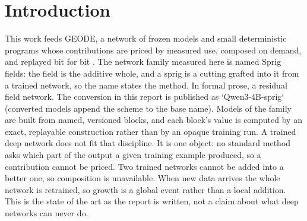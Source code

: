 \documentclass[11pt]{article}
\begin{document}
\begin{abstract}
No prior work converts a pretrained network into nonlinear
closed-form stages that keep exact attribution, deterministic
replay, growth by addition, and composition under a measured gate.
The nearest line replaces pruned transformer blocks with
least-squares linear maps for compression and claims none of
those properties; the transcoder line gives additive attribution
but trains its replacement and does not serve it. Every borrowed
part is cited, and where a neighbouring method does something
better, its adoption is planned and named. The feed-forward
conversion is measured across all thirty-six stages, and the
delivered conversion carries the attention of all thirty-six
layers as well, with its quality limits stated. The benefits also port back to unconverted,
conventionally trained networks: the same closed-form reads give
a trained network's patches measured per-layer contracts without
any conversion, an audit shadow that matches across devices
exactly; its readout can be refitted in closed form on its own
output stream at no loss; and least-squares targets inserted
into training itself deliver measured per-layer contracts at
parity-or-better held-out quality. The negative results that
decided the architecture are published with the positives.
\end{abstract}

\tableofcontents

\section{Introduction}

This work feeds GEODE, a network of frozen models and small
deterministic programs whose contributions are priced by measured
use, composed on demand, and replayed bit for bit
\cite{whitepaper}. The network family measured here is named
Sprig fields: the field is the additive whole, and a sprig is a
cutting grafted into it from a trained network, so the name states
the method. In formal prose, a residual field network. The
conversion in this report is published as `Qwen3-4B-sprig`
(converted models append the scheme to the base name). Models
of the family are built from named, versioned blocks, and
each block's value is computed by an exact, replayable
construction rather than by an opaque training run. A trained deep
network does not fit that discipline. It is one object: no standard
method asks which part of the output a given training example
produced, so a contribution cannot be priced. Two trained networks
cannot be added into a better one, so composition is unavailable.
When new data arrives the whole network is retrained, so growth is
a global event rather than a local addition. This is the state of
the art as the report is written, not a claim about what deep
networks can never do.
\end{document}

